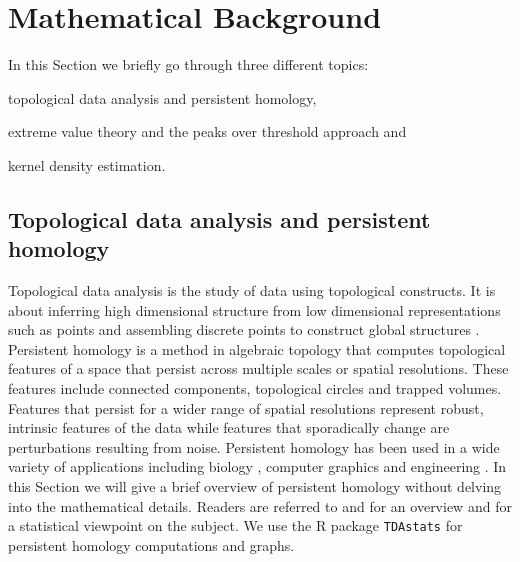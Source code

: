 \documentclass[letter,12pt]{article}
\begin{document}
\section{Mathematical Background}\label{sec:methodology}
In this Section we briefly go through three different topics: \begin{inparaenum} \item topological data analysis and persistent homology, \item extreme value theory and the peaks over threshold approach and \item kernel density estimation. \end{inparaenum}  

\subsection{Topological data analysis and persistent homology}\label{subsec:tda}
Topological data analysis is the study of data using topological constructs. It is about inferring high dimensional structure from low dimensional representations such as points and assembling discrete points to construct global structures \citep{ghrist2008barcodes}. Persistent homology is a method in algebraic topology that computes topological features of a space that persist across multiple scales or spatial resolutions. These features include connected components, topological circles and trapped volumes.  Features that persist for a wider range of spatial resolutions represent robust, intrinsic features of the data while features that sporadically change are perturbations resulting from noise. Persistent homology has been used in a wide variety of applications including biology  \citep{topaz2015topological}, computer graphics \citep{carlsson2008local} and engineering \citep{perea2015sliding}. In this Section we will give a brief overview of persistent homology without delving into the mathematical details. Readers are referred to \cite{ghrist2008barcodes} and \cite{Carlsson2009} for an overview and \cite{wasserman2018topological} for a statistical viewpoint on the subject. We use the R package \texttt{TDAstats} for persistent homology computations and graphs.
\end{document}
